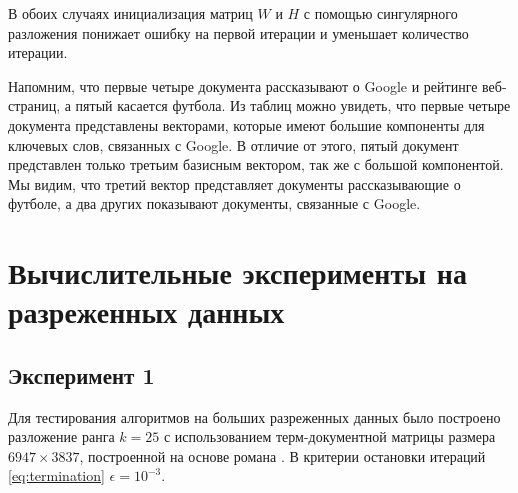 В обоих случаях инициализация матриц $W$ и $H$ с помощью сингулярного разложения понижает ошибку на первой итерации и уменьшает количество итерации.

Напомним, что первые четыре документа рассказывают о Google и рейтинге веб-страниц,
а пятый касается футбола. Из таблиц можно увидеть, что первые четыре документа представлены векторами,
которые имеют большие компоненты для ключевых слов, связанных с Google.
В отличие от этого, пятый документ представлен только третьим базисным вектором, так же с большой компонентой.
Мы видим, что третий вектор представляет документы рассказывающие о футболе, а два других показывают документы, связанные с Google.






\newpage





\section{Вычислительные эксперименты на разреженных данных}

\subsection{Эксперимент 1}

Для тестирования алгоритмов на больших разреженных данных
было построено разложение ранга $k = 25$ с использованием терм-документной матрицы размера $6947 \times 3837$,
построенной на основе романа .
В критерии остановки итераций \eqref{eq:termination} $\epsilon = 10^{-3}$.

